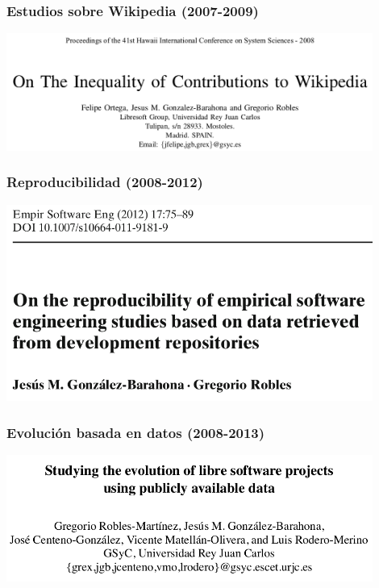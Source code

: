 \begin{frame}[fragile]
  \frametitle{Estudios sobre Wikipedia (2007-2009)}

  \begin{center}
  \includegraphics[width=12cm]{figs/wikipedia}
  \end{center}  
  
\end{frame}

\begin{frame}[fragile]
  \frametitle{Reproducibilidad (2008-2012)}

  \begin{center}
  \includegraphics[width=12cm]{figs/reproducibility}
  \end{center}  
  
\end{frame}

\begin{frame}[fragile]
  \frametitle{Evolución basada en datos (2008-2013)}

  \begin{center}
  \includegraphics[width=12cm]{figs/evolution-data}
  \end{center}  
  
\end{frame}

